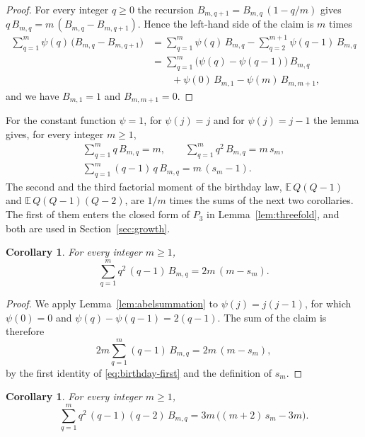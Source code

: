 \documentclass{amsart}
\newtheorem{corollary}[theorem]{Corollary}
\theoremstyle{definition}
\theoremstyle{remark}
\numberwithin{equation}{section}
\begin{document}
\begin{proof}
For every integer $q\ge0$ the recursion $B_{m,q+1}=B_{m,q}\,(1-q/m)$ gives
$q\,B_{m,q}=m\,(B_{m,q}-B_{m,q+1})$. Hence the left-hand side of the claim
is $m$ times
\begin{align*}
\sum_{q=1}^{m}\psi(q)\,\bigl(B_{m,q}-B_{m,q+1}\bigr)
&=\sum_{q=1}^{m}\psi(q)\,B_{m,q}-\sum_{q=2}^{m+1}\psi(q-1)\,B_{m,q}\\
&=\sum_{q=1}^{m}\bigl(\psi(q)-\psi(q-1)\bigr)\,B_{m,q}\\
&\qquad+\psi(0)\,B_{m,1}-\psi(m)\,B_{m,m+1},
\end{align*}
and we have $B_{m,1}=1$ and $B_{m,m+1}=0$.
\end{proof}

For the constant function $\psi=1$, for
$\psi(j)=j$ and for $\psi(j)=j-1$ the lemma gives, for every integer
$m\ge1$,
\begin{equation}\label{eq:birthday-first}
\begin{gathered}
\sum_{q=1}^{m}q\,B_{m,q}=m,\qquad
\sum_{q=1}^{m}q^{2}\,B_{m,q}=m\,s_m,\\
\sum_{q=1}^{m}(q-1)\,q\,B_{m,q}=m\,(s_m-1).
\end{gathered}
\end{equation}
The second and the third factorial moment of the birthday law,
$\mathbb{E}\,Q(Q-1)$ and $\mathbb{E}\,Q(Q-1)(Q-2)$, are $1/m$ times the
sums of the next two
corollaries. The first of them enters the closed form of $P_3$ in
Lemma~\ref{lem:threefold}, and both are used in
Section~\ref{sec:growth}.

\begin{corollary}\label{cor:secondfactorial}
For every integer $m\ge1$,
\[
\sum_{q=1}^{m}q^{2}\,(q-1)\,B_{m,q}=2m\,(m-s_m).
\]
\end{corollary}

\begin{proof}
We apply Lemma~\ref{lem:abelsummation} to $\psi(j)=j(j-1)$, for which
$\psi(0)=0$ and $\psi(q)-\psi(q-1)=2(q-1)$. The sum of the claim is
therefore
\[
2m\sum_{q=1}^{m}(q-1)\,B_{m,q}=2m\,(m-s_m),
\]
by the first identity of \eqref{eq:birthday-first} and the definition
of $s_m$.
\end{proof}

\begin{corollary}\label{cor:thirdfactorial}
For every integer $m\ge1$,
\[
\sum_{q=1}^{m}q^{2}\,(q-1)(q-2)\,B_{m,q}=3m\,\bigl((m+2)\,s_m-3m\bigr).
\]
\end{corollary}
\end{document}
